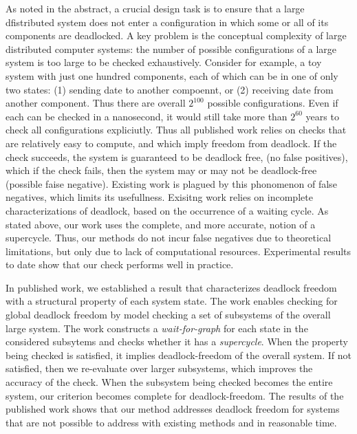 As noted in the abstract, a crucial design task is to ensure that a large dfistributed system does not enter a configuration in which some or all of
its components are deadlocked. 
A key problem is the conceptual complexity of large distributed computer systems: the number of possible configurations of a large system is 
too large to be checked exhaustively. Consider for example, a toy system with just one hundred components, each of which can be in
one of only two states: (1) sending date to another compoennt, or (2) receiving date from another component. Thus there are overall $2^{100}$ possible
configurations. Even if each can be checked in a nanosecond, it would still take more than $2^{60}$ years to check all configurations expliciutly.
%
Thus all published work relies on checks that are 
relatively easy to compute, and which imply freedom from deadlock. If the check succeeds, the system is guaranteed to be deadlock free, (no false
positives), which if the check fails, then the system may or may not be deadlock-free (possible faise negative).  Existing work is plagued by this
phonomenon of false negatives, which limits its usefullness.
%
Exisitng work relies on incomplete characterizations of deadlock, based on the occurrence of a waiting cycle. 
As stated above, our work uses the complete, and more accurate, notion of a supercycle. Thus, our methods do not incur false negatives due to 
theoretical limitations, but only due to lack of computational resources. Experimental results to date show that our check performs well in practice.



%



In published work, we established a result that characterizes deadlock freedom with a structural property of each system state.  The work enables
checking for global deadlock freedom by model checking a set of subsystems of the overall large system.  The work constructs a {\em wait-for-graph}
for each state in the considered subsytems and checks whether it has a {\em supercycle}.
%
When the property being checked is satisfied, it implies deadlock-freedom of the overall system.  If not satisfied, then we re-evaluate over larger
subsystems, which improves the accuracy of the check.  When the subsystem being checked becomes the entire system, our criterion becomes complete for
deadlock-freedom.
%
The results of the published work shows that our method addresses deadlock freedom for systems that are not possible to address with existing methods
and in reasonable time.
%



